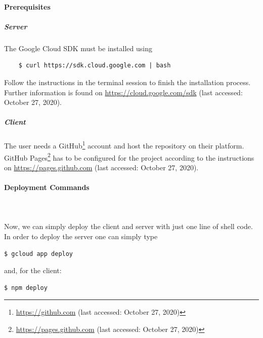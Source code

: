 \paragraph{Prerequisites}   

\subparagraph{Server}
The Google Cloud SDK must be installed using 
\begin{verbatim}
    $ curl https://sdk.cloud.google.com | bash
\end{verbatim}
Follow the instructions in the terminal session to finish the installation process. Further information is found on \url{https://cloud.google.com/sdk} (last accessed: October 27, 2020).

\subparagraph{Client}
The user needs a GitHub\footnote{\url{https://github.com} (last accessed: October 27, 2020)} account and host the repository on their platform. GitHub Pages\footnote{\url{https://pages.github.com} (last accessed: October 27, 2020)} has to be configured for the project according to the instructions on \url{https://pages.github.com} (last accessed: October 27, 2020).

\paragraph{Deployment Commands}\mbox{}\\\\
Now, we can simply deploy the client and server with just one line of shell code.
In order to deploy the server one can simply type
\begin{verbatim}
$ gcloud app deploy
\end{verbatim}
and, for the client:
\begin{verbatim}
$ npm deploy
\end{verbatim}